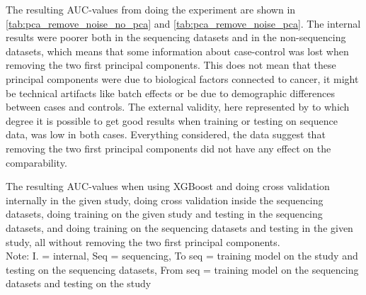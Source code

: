 {{{{{{{{{{{{The resulting AUC-values from doing the experiment are shown in \autoref{tab:pca_remove_noise_no_pca} and \autoref{tab:pca_remove_noise_pca}. The internal results were poorer both in the sequencing datasets and in the non-sequencing datasets, which means that some information about case-control was lost when removing the two first principal components. This does not mean that these principal components were due to biological factors connected to cancer, it might be technical artifacts like batch effects or be due to demographic differences between cases and controls. The external validity, here represented by to which degree it is possible to get good results when training or testing on sequence data, was low in both cases. Everything considered, the data suggest that removing the two first principal components did not have any effect on the comparability.

\begin{table}
    \caption{The resulting AUC-values when using XGBoost and doing cross validation internally in the given study, doing cross validation inside the sequencing datasets, doing training on the given study and testing in the sequencing datasets, and doing training on the sequencing datasets and testing in the given study, all without removing the two first principal components. \\
    Note: I. = internal, Seq = sequencing, To seq = training model on the study and testing on the sequencing datasets, From seq = training model on the sequencing datasets and testing on the study}
    \label{tab:pca_remove_noise_no_pca}
    \begin{center}
    \end{center}
\end{table}

}}}}}}}}}}}}
